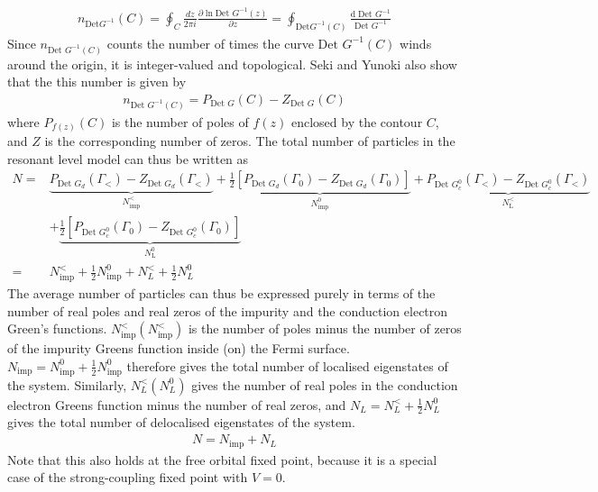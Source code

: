 \begin{equation}\begin{aligned}
	n_{\text{Det} G^{-1}}(C) = \oint_{C} \frac{dz}{2\pi i} \frac{\partial{\ln\text{Det }G^{-1}(z)}}{\partial{z}} = \oint_{\text{Det} G^{-1}(C)} \frac{\mathrm{d}\; \text{Det }G^{-1}}{\text{Det }G^{-1}}
\end{aligned}\end{equation}
Since \(n_{\text{Det } G^{-1}(C)}\) counts the number of times the curve \(\text{Det } G^{-1}(C)\) winds around the origin, it is integer-valued and topological. Seki and Yunoki also show that the this number is given by
\begin{equation}\begin{aligned}
n_{\text{Det }G^{-1}(C)} = P_{\text{Det }G}(C) - Z_{\text{Det }G}(C)
\end{aligned}\end{equation}
where \(P_{f(z)}(C)\) is the number of poles of \(f(z)\) enclosed by the contour \(C\), and \(Z\) is the corresponding number of zeros. The total number of particles in the resonant level model can thus be written as
\begin{equation}\begin{aligned}
	N =& \underbrace{P_{\text{Det }G_d}(\Gamma_<) - Z_{\text{Det }G_d}(\Gamma_<)}_{N_\text{imp}^<} + \underbrace{\frac{1}{2}\left[P_{\text{Det }G_d}(\Gamma_0) - Z_{\text{Det }G_d}(\Gamma_0)\right]}_{N_\text{imp}^0} + \underbrace{P_{\text{Det }G_{c}^{0}}(\Gamma_<) - Z_{\text{Det }G_{c}^{0}}(\Gamma_<)}_{N_\text{L}^<} \\
	  &+ \underbrace{\frac{1}{2}\left[P_{\text{Det }G_{c}^{0}}(\Gamma_0) - Z_{\text{Det }G_{c}^{0}}(\Gamma_0)\right]}_{N_\text{L}^0}\\
	  =& N_\text{imp}^< + \frac{1}{2}N_\text{imp}^0 + N_L^< + \frac{1}{2}N_L^0
\end{aligned}\end{equation}
The average number of particles can thus be expressed purely in terms of the number of real poles and real zeros of the impurity and the conduction electron Green's functions. \(N_\text{imp}^<\left(N_\text{imp}^<\right)\) is the number of poles minus the number of zeros of the impurity Greens function inside (on) the Fermi surface. \(N_\text{imp} = N_\text{imp}^0 + \frac{1}{2}N_\text{imp}^0\)  therefore gives the total number of localised eigenstates of the system. Similarly, \(N_L^<\left( N_L^0 \right) \) gives the number of real poles in the conduction electron Greens function minus the number of real zeros, and \(N_L = N_L^< + \frac{1}{2}N_L^0\) gives the total number of delocalised eigenstates of the system.
\begin{equation}\begin{aligned}
	\label{total_lutt}
	N = N_\text{imp} + N_L
\end{aligned}\end{equation}
Note that this also holds at the free orbital fixed point, because it is a special case of the strong-coupling fixed point with \(V=0\).

